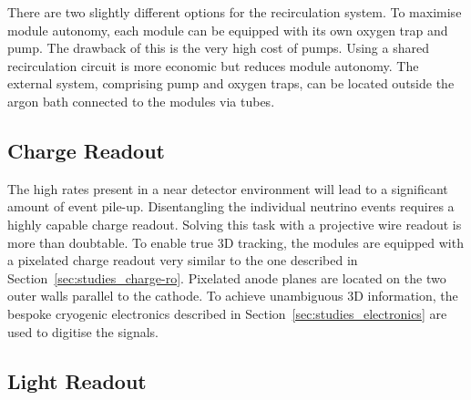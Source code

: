 There are two slightly different options for the recirculation system.
To maximise module autonomy, each module can be equipped with its own oxygen trap and \lar{} pump.
The drawback of this is the very high cost of \lar{} pumps.
Using a shared recirculation circuit is more economic but reduces module autonomy.
The external system, comprising pump and oxygen traps, can be located outside the argon bath connected to the modules via tubes.

\afterpage{\clearpage}


\subsection*{Charge Readout}

The high rates present in a near detector environment will lead to a significant amount of event pile-up.
Disentangling the individual neutrino events requires a highly capable charge readout.
Solving this task with a projective wire readout is more than doubtable.
To enable true 3D tracking, the modules are equipped with a pixelated charge readout very similar to the one described in Section~\ref{sec:studies_charge-ro}.
Pixelated anode planes are located on the two outer walls parallel to the cathode.
To achieve unambiguous 3D information, the bespoke \pixlar{} cryogenic electronics described in Section~\ref{sec:studies_electronics} are used to digitise the signals.

\afterpage{\clearpage}


\subsection*{Light Readout}

